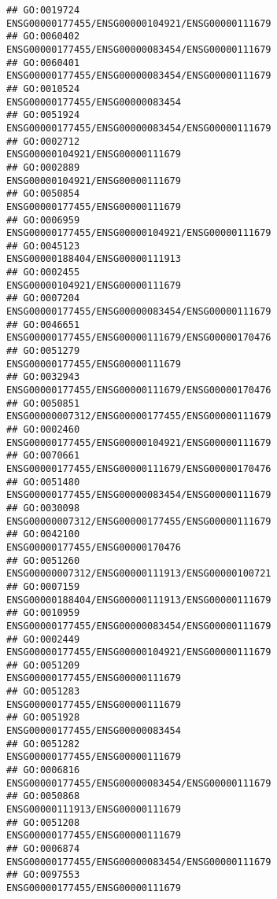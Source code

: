 \documentclass[
]{article}
\begin{document}
\begin{verbatim}
## GO:0019724                 ENSG00000177455/ENSG00000104921/ENSG00000111679
## GO:0060402                 ENSG00000177455/ENSG00000083454/ENSG00000111679
## GO:0060401                 ENSG00000177455/ENSG00000083454/ENSG00000111679
## GO:0010524                                 ENSG00000177455/ENSG00000083454
## GO:0051924                 ENSG00000177455/ENSG00000083454/ENSG00000111679
## GO:0002712                                 ENSG00000104921/ENSG00000111679
## GO:0002889                                 ENSG00000104921/ENSG00000111679
## GO:0050854                                 ENSG00000177455/ENSG00000111679
## GO:0006959                 ENSG00000177455/ENSG00000104921/ENSG00000111679
## GO:0045123                                 ENSG00000188404/ENSG00000111913
## GO:0002455                                 ENSG00000104921/ENSG00000111679
## GO:0007204                 ENSG00000177455/ENSG00000083454/ENSG00000111679
## GO:0046651                 ENSG00000177455/ENSG00000111679/ENSG00000170476
## GO:0051279                                 ENSG00000177455/ENSG00000111679
## GO:0032943                 ENSG00000177455/ENSG00000111679/ENSG00000170476
## GO:0050851                 ENSG00000007312/ENSG00000177455/ENSG00000111679
## GO:0002460                 ENSG00000177455/ENSG00000104921/ENSG00000111679
## GO:0070661                 ENSG00000177455/ENSG00000111679/ENSG00000170476
## GO:0051480                 ENSG00000177455/ENSG00000083454/ENSG00000111679
## GO:0030098                 ENSG00000007312/ENSG00000177455/ENSG00000111679
## GO:0042100                                 ENSG00000177455/ENSG00000170476
## GO:0051260                 ENSG00000007312/ENSG00000111913/ENSG00000100721
## GO:0007159                 ENSG00000188404/ENSG00000111913/ENSG00000111679
## GO:0010959                 ENSG00000177455/ENSG00000083454/ENSG00000111679
## GO:0002449                 ENSG00000177455/ENSG00000104921/ENSG00000111679
## GO:0051209                                 ENSG00000177455/ENSG00000111679
## GO:0051283                                 ENSG00000177455/ENSG00000111679
## GO:0051928                                 ENSG00000177455/ENSG00000083454
## GO:0051282                                 ENSG00000177455/ENSG00000111679
## GO:0006816                 ENSG00000177455/ENSG00000083454/ENSG00000111679
## GO:0050868                                 ENSG00000111913/ENSG00000111679
## GO:0051208                                 ENSG00000177455/ENSG00000111679
## GO:0006874                 ENSG00000177455/ENSG00000083454/ENSG00000111679
## GO:0097553                                 ENSG00000177455/ENSG00000111679

\end{verbatim}
\end{document}
